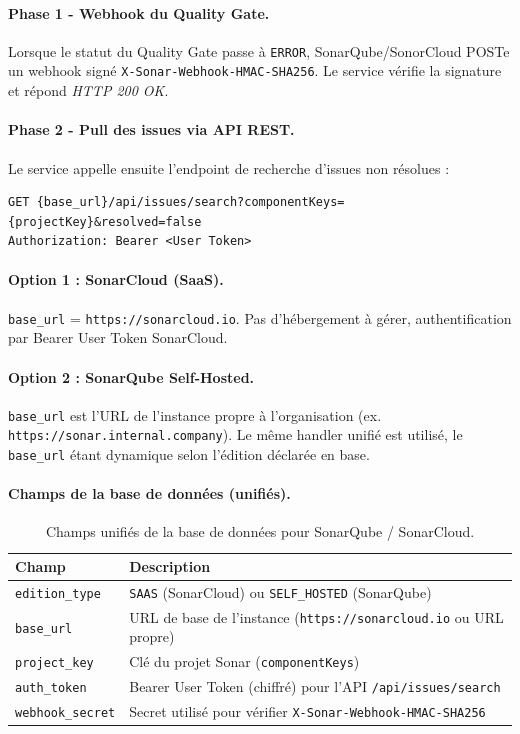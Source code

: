 \documentclass[12pt,a4paper]{article}
\newcommand{\code}[1]{\texttt{#1}}
\begin{document}
\paragraph{Phase 1 - Webhook du Quality Gate.} Lorsque le statut du Quality Gate passe à \code{ERROR}, SonarQube/SonorCloud POSTe un webhook signé \code{X-Sonar-Webhook-HMAC-SHA256}. Le service vérifie la signature et répond \emph{HTTP 200 OK}.

\paragraph{Phase 2 - Pull des issues via API REST.} Le service appelle ensuite l'endpoint de recherche d'issues non résolues :

\begin{lstlisting}[caption={Appel API SonarQube/SonorCloud pour récupérer les issues}]
GET {base_url}/api/issues/search?componentKeys={projectKey}&resolved=false
Authorization: Bearer <User Token>
\end{lstlisting}

\paragraph{Option 1 : SonarCloud (SaaS).} \code{base_url} = \code{https://sonarcloud.io}. Pas d'hébergement à gérer, authentification par Bearer User Token SonarCloud.

\paragraph{Option 2 : SonarQube Self-Hosted.} \code{base_url} est l'URL de l'instance propre à l'organisation (ex. \code{https://sonar.internal.company}). Le même handler unifié est utilisé, le \code{base_url} étant dynamique selon l'édition déclarée en base.

\paragraph{Champs de la base de données (unifiés).}

\begin{table}[H]
\centering
\small
\begin{tabular}{@{}p{3.2cm}p{8.2cm}@{}}
\toprule
\textbf{Champ} & \textbf{Description} \\
\midrule
\code{edition\_type} & \code{SAAS} (SonarCloud) ou \code{SELF\_HOSTED} (SonarQube) \\
\code{base\_url} & URL de base de l'instance (\code{https://sonarcloud.io} ou URL propre) \\
\code{project\_key} & Clé du projet Sonar (\code{componentKeys}) \\
\code{auth\_token} & Bearer User Token (chiffré) pour l'API \code{/api/issues/search} \\
\code{webhook\_secret} & Secret utilisé pour vérifier \code{X-Sonar-Webhook-HMAC-SHA256} \\
\bottomrule
\end{tabular}
\caption{Champs unifiés de la base de données pour SonarQube / SonarCloud.}
\label{tab:sonar-db}
\end{table}
\end{document}
